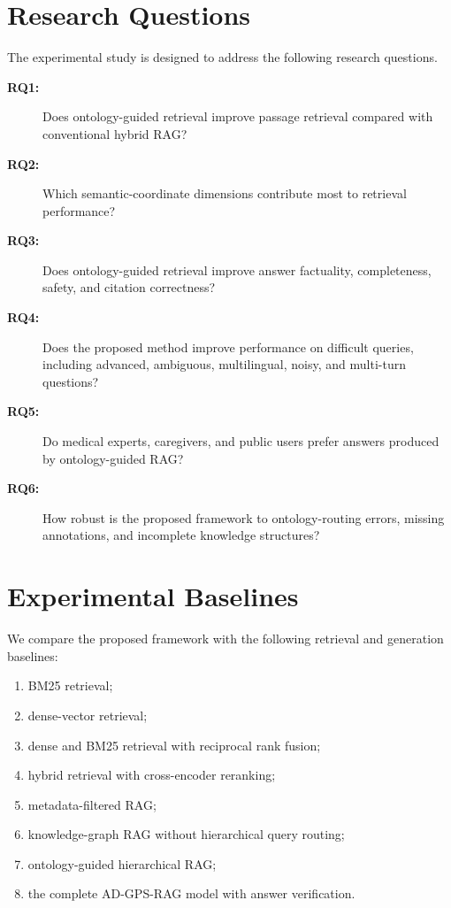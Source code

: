 \documentclass{article}
\begin{document}
\section{Research Questions}
The experimental study is designed to address the following research questions.
\begin{description}
    \item[\textbf{RQ1:}]
    Does ontology-guided retrieval improve passage retrieval compared with conventional hybrid RAG?
    \item[\textbf{RQ2:}]
    Which semantic-coordinate dimensions contribute most to retrieval 
    performance?
    \item[\textbf{RQ3:}]
    Does ontology-guided retrieval improve answer factuality, completeness, safety, and citation correctness?

    \item[\textbf{RQ4:}]
    Does the proposed method improve performance on difficult queries, including advanced, ambiguous, multilingual, noisy, and multi-turn questions?

    \item[\textbf{RQ5:}]
    Do medical experts, caregivers, and public users prefer answers produced by ontology-guided RAG?

    \item[\textbf{RQ6:}]
    How robust is the proposed framework to ontology-routing errors, missing annotations, and incomplete knowledge structures?
\end{description}

\section{Experimental Baselines}
We compare the proposed framework with the following retrieval and generation 
baselines:
\begin{enumerate}
    \item BM25 retrieval;
    \item dense-vector retrieval;
    \item dense and BM25 retrieval with reciprocal rank fusion;
    \item hybrid retrieval with cross-encoder reranking;
    \item metadata-filtered RAG;
    \item knowledge-graph RAG without hierarchical query routing;
    \item ontology-guided hierarchical RAG;
    \item the complete AD-GPS-RAG model with answer verification.
\end{enumerate}
\end{document}
